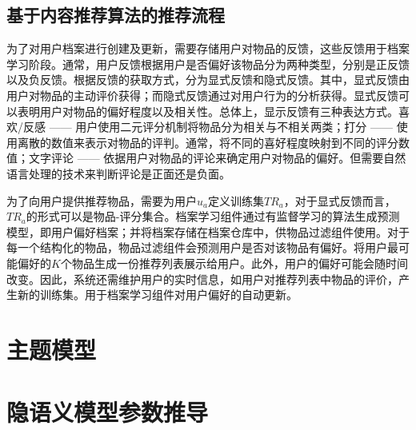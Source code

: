 \subsection{基于内容推荐算法的推荐流程}

为了对用户档案进行创建及更新，需要存储用户对物品的反馈，这些反馈用于档案学习阶段。通常，用户反馈根据用户是否偏好该物品分为两种类型，分别是正反馈以及负反馈。根据反馈的获取方式，分为显式反馈和隐式反馈。其中，显式反馈由用户对物品的主动评价获得；而隐式反馈通过对用户行为的分析获得。显式反馈可以表明用户对物品的偏好程度以及相关性。总体上，显示反馈有三种表达方式。喜欢/反感 —— 用户使用二元评分机制将物品分为相关与不相关两类；打分 —— 使用离散的数值来表示对物品的评判。通常，将不同的喜好程度映射到不同的评分数值；文字评论 —— 依据用户对物品的评论来确定用户对物品的偏好。但需要自然语言处理的技术来判断评论是正面还是负面。

为了向用户提供推荐物品，需要为用户$u_a$定义训练集$TR_a$，对于显式反馈而言，$TR_a$的形式可以是物品-评分集合。档案学习组件通过有监督学习的算法生成预测模型，即用户偏好档案；并将档案存储在档案仓库中，供物品过滤组件使用。对于每一个结构化的物品，物品过滤组件会预测用户是否对该物品有偏好。将用户最可能偏好的$K$个物品生成一份推荐列表展示给用户。此外，用户的偏好可能会随时间改变。因此，系统还需维护用户的实时信息，如用户对推荐列表中物品的评价，产生新的训练集。用于档案学习组件对用户偏好的自动更新。



\section{主题模型}



\section{隐语义模型参数推导}